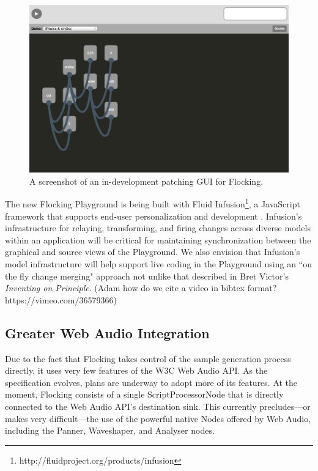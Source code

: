 \documentclass{article}
\begin{document}
\begin{figure}[ht]
\centering
\includegraphics[width=0.9\columnwidth]{images/flocking-playground-graphical-view.png}
\caption{ A screenshot of an in-development patching GUI for Flocking.\label{fig:graphical}}
\end{figure}

The new Flocking Playground is being built with Fluid Infusion\footnote{http://fluidproject.org/products/infusion}, a JavaScript framework that supports end-user personalization and development \cite{hcii2014}. Infusion's infrastructure for relaying, transforming, and firing changes across diverse models within an application will be critical for maintaining synchronization between the graphical and source views of the Playground. We also envision that Infusion's model infrastructure will help support live coding in the Playground using an ``on the fly change merging" approach not unlike that described in Bret Victor's {\it Inventing on Principle}\cite{inventingonprinciple}. (Adam how do we cite a video in bibtex format? https://vimeo.com/36579366)

\subsection{Greater Web Audio Integration}

Due to the fact that Flocking takes control of the sample generation process directly, it uses very few features of the W3C Web Audio API. As the specification evolves, plans are underway to adopt more of its features. At the moment, Flocking consists of a single ScriptProcessorNode that is directly connected to the Web Audio API's destination sink. This currently precludes---or makes very difficult---the use of the powerful native Nodes offered by Web Audio, including the Panner, Waveshaper, and Analyser nodes.
\end{document}
